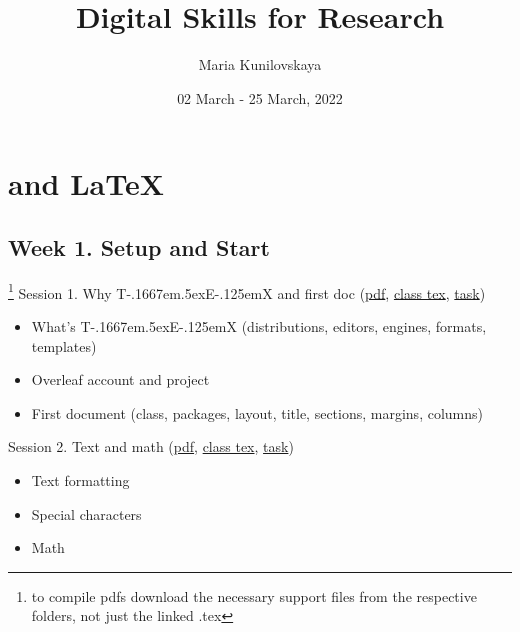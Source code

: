 \documentclass[a4paper,12pt]{article} %
\title{\vspace{-4em} Digital Skills for Research}
\author{Maria Kunilovskaya}
\date{02 March - 25 March, 2022}
\def\TeX{{\rm T\kern-.1667em\lower.5ex\hbox{E}\kern-.125emX }}
\begin{document}
	
\clearpage\maketitle
\thispagestyle{empty}	
\maketitle

\vspace{-2em}

\section{{\color{red}\TeX and \LaTeX}}

\subsection{Week 1. Setup and Start}\footnote{to compile pdfs download the necessary support files from the respective folders, not just the linked .tex}
	Session 1. Why \TeX and first doc (\href{https://canvas.wlv.ac.uk/courses/33429/files/folder/latex_mendeley_github/w1-3_latex?preview=4622172}{pdf}, \href{https://github.com/kunilovskaya/dskills_workshop/blob/main/w1_latex_basics/session1.tex}{class tex}, \href{https://github.com/kunilovskaya/dskills_workshop/blob/main/w1_latex_basics/task1.tex}{task})
		\begin{itemize}
			\item What's \TeX (distributions, editors, engines, formats, templates)
			\item Overleaf account and project
			\item First document (class, packages, layout, title, sections, margins, columns)
		\end{itemize} 
	Session 2. Text and math (\href{https://canvas.wlv.ac.uk/courses/33429/files/folder/latex_mendeley_github/w1-3_latex?preview=4623463}{pdf}, \href{https://github.com/kunilovskaya/dskills_workshop/blob/main/w1_latex_basics/session1.tex}{class tex}, \href{https://github.com/kunilovskaya/dskills_workshop/blob/main/w1_latex_basics/task2.pdf}{task})
		\begin{itemize}
			\item Text formatting
			\item Special characters
			\item Math
		\end{itemize}
\end{document}
